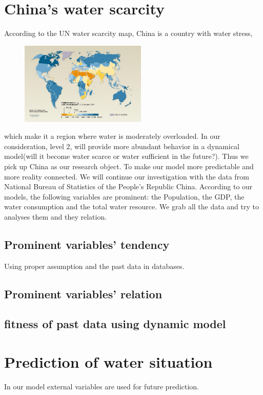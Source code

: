 \section{China's water scarcity}
  According to the UN water scarcity map\cite{WaterScarcityMap}, China is a country with water stress,
  \begin{figure}
  \includegraphics[width = 6cm]{picture/WaterScarcityMap.jpg}
  \end{figure}
  which make it a region where water is moderately overloaded. In our consideration, level 2, will provide more abundant behavior in a dynamical model(will it become water scarce or water sufficient in the future?). Thus we pick up China as our research object. To make our model more predictable and more reality connected. We will continue our investigation with the data from National Bureau of Statistics of the People's Republic China\cite{ChinaDataBase}.
  According to our models, the following variables are prominent: the Population, the GDP, the water consumption and the total water resource.
  We grab all the data and try to analyses them and they relation.

  \subsection{Prominent variables' tendency}
  Using proper assumption and the past data in databases.

  \subsection{Prominent variables' relation}

  \subsection{fitness of past data using dynamic model}


\section{Prediction of water situation}
  In our model external variables are used for future prediction.


